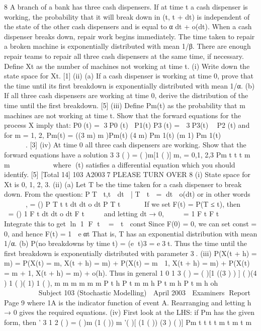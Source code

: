 \documentclass[a4paper,12pt]{article}
\begin{document}
\begin{enumerate}

8 A branch of a bank has three cash dispensers. If at time t a cash dispenser is working,
the probability that it will break down in (t, t + dt) is independent of the state of the
other cash dispensers and is equal to
α dt + o(dt).
When a cash dispenser breaks down, repair work begins immediately. The time taken
to repair a broken machine is exponentially distributed with mean 1/β. There are
enough repair teams to repair all three cash dispensers at the same time, if necessary.
Define Xt as the number of machines not working at time t.
(i) Write down the state space for Xt. [1]
(ii) (a) If a cash dispenser is working at time 0, prove that the time until its
first breakdown is exponentially distributed with mean 1/α.
(b) If all three cash dispensers are working at time 0, derive the
distribution of the time until the first breakdown. [5]
(iii) Define Pm(t) as the probability that m machines are not working at time t.
Show that the forward equations for the process X imply that:
P0(t) = 3P0 (t) P1(t)
P3(t) =  3P3(t)  P2 (t)
and for m = 1, 2,
Pm(t) = ((3 m) m )Pm(t) (4 m) Pm 1(t) (m 1) Pm 1(t)              .
[3]
(iv) At time 0 all three cash dispensers are working. Show that the forward
equations have a solution
3 3
( ) = ( )m[1 ( )] m, = 0,1, 2,3
Pm t t t m
m

 
   
 
where (t) satisfies a differential equation which you should identify. [5]
[Total 14]
103 A20037 PLEASE TURN OVER
8 (i) State space for Xt is {0, 1, 2, 3}.
(ii) (a) Let T be the time taken for a cash dispenser to break down. From the
question:
PT t,t  dt  | T  t  = dt  o(dt)
or in other words
   
 
,
= ()
P T t t dt
dt o dt
P T t
 
 

If we set F(t) = P(T ≤ t), then
 
 
= ()
1
F t dt
dt o dt
F t

 

and letting dt → 0,
 
 
=
1
F t
F t



Integrate this to get ln 1 F t  =  t  const
Since F(0) = 0, we can set const = 0, and hence F(t) = 1  eαt
That is, T has an exponential distribution with mean 1/α.
(b) P(no breakdowns by time t) = (et)3 = e3t. Thus the time until the
first breakdown is exponentially distributed with parameter 3.
(iii) P(X(t + h) = m) = P(X(t) = m, X(t + h) = m) + P(X(t) = m  1, X(t + h) = m)
+ P(X(t) = m + 1, X(t + h) = m) + o(h).
Thus in general
1 0
1 3
( ) = ( )[1 ((3 ) ) ] ( )(4 ) 1
( )( 1) 1 ( ),
m m m m
m m
P t h P t m m h P t m h
P t m h oh
 
 
        
   
Subject 103 (Stochastic Modelling)  April 2003  Examiners Report
Page 9
where 1A is the indicator function of event A.
Rearranging and letting h → 0 gives the required equations.
(iv) First look at the LHS: if Pm has the given form, then
’ 3 1 2
( ) = ( )m (1 ( )) m ’( )[ (1 ( )) (3 ) ( )]
Pm t t t t m t m t
m
   


\end{enumerate}
\end{document}
